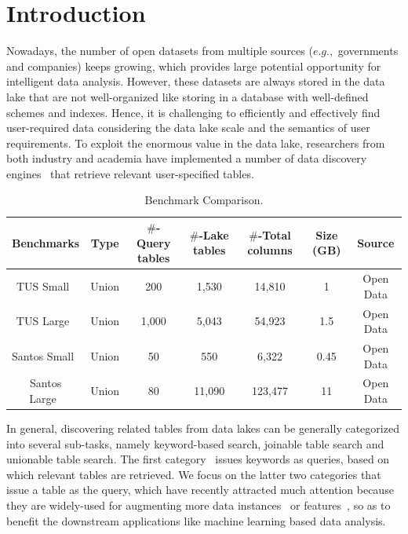 
\section{Introduction}
 
Nowadays, the number of open datasets from multiple sources ($e.g.,$ governments and companies) keeps growing, which provides large potential opportunity for intelligent data analysis. However, these datasets are always stored in the data lake that are not well-organized like storing in a database with well-defined schemes and indexes. Hence, it is challenging to efficiently and effectively find user-required data considering the data lake scale and the semantics of user requirements.  
To exploit the enormous value in the data lake, researchers from both industry and academia have implemented a number of data discovery engines~\cite{} that retrieve relevant user-specified tables. 



\begin{table}[t]
	\centering
	\caption{Benchmark Comparison.}
	\begin{tabular}{|c|c|c|c|c|c|c|}
		\hline
		\centering
		Benchmarks & Type & $\#$-Query tables & $\#$-Lake tables & $\#$-Total columns & Size (GB) & Source  \\
		\hline
		TUS Small~\cite{TUS}& Union  & 200 & 1,530 & 14,810 & 1 & Open Data  \\
		\hline
		TUS Large~\cite{TUS}& Union  & 1,000 & 5,043 & 54,923 & 1.5 & Open Data  \\
		\hline
		Santos Small~\cite{Santos}& Union  & 50 & 550 & 6,322 & 0.45 & Open Data  \\
		\hline
		Santos Large~\cite{Santos}& Union  & 80 & 11,090 & 123,477 & 11 & Open Data  \\
		\hline
	\end{tabular}
	\label{Table:benchmarks}

\end{table}

In general, discovering related tables from data lakes can be generally categorized into several sub-tasks, namely keyword-based search, joinable table search and unionable table search.
The first category~\cite{} issues keywords as queries, based on which relevant tables are retrieved. 
We focus on the latter two categories that issue a table as the query, which have recently attracted much attention because they are widely-used for augmenting more data instances~\cite{} or features~\cite{}, so as to  benefit the downstream applications like machine learning based data analysis.
%


